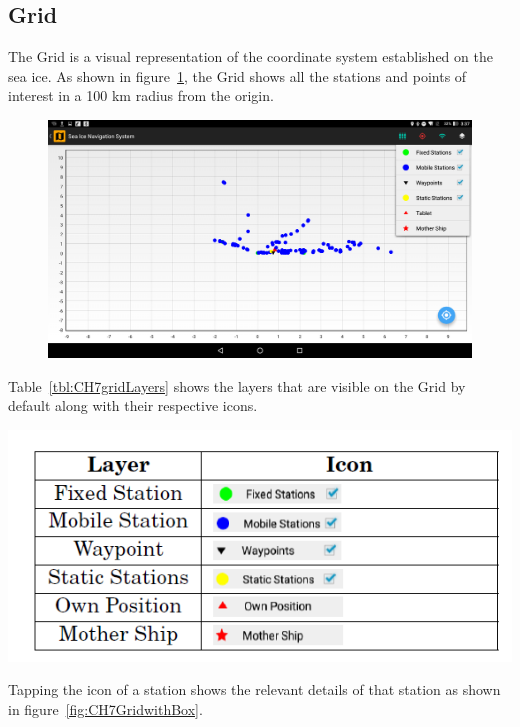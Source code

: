 \subsection{Grid}
\label{subsec:subsec7_1_2}
\noindent
The Grid is a visual representation of the coordinate system established on the sea ice. As shown in figure~\ref{fig:CH7GridwithLayers}, the Grid shows all the stations and points of interest in a 100 km radius from the origin.
%
\begin{figure}[h]
	\centering
	\includegraphics[height=0.3\textheight]{fig07/GridwithLayers.png}
	\label{fig:CH7GridwithLayers}
\end{figure}
%
\newpage
\noindent
Table~\ref{tbl:CH7gridLayers} shows the layers that are visible on the Grid by default along with their respective icons.
%
\begin{table}[h]
	\includegraphics[width=0.75\linewidth]{fig07/LayerTable.png}
	\centering
	\label{tbl:CH7gridLayers}
\end{table}
%
\newline
\noindent
Tapping the icon of a station shows the relevant details of that station as shown in figure~\ref{fig:CH7GridwithBox}.
